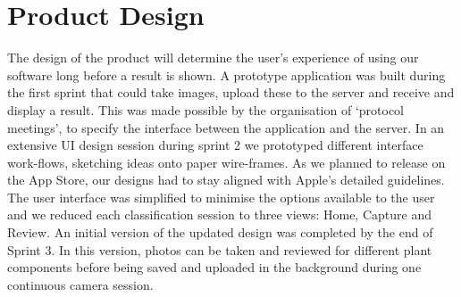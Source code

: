 \documentclass[a4paper,11pt]{article}
\begin{document}
\clearpage

\section{Product Design}

The design of the product will determine the user's experience of using our software long before a result is shown. A prototype application was built during the first sprint that could take images, upload these to the server and receive and display a result. This was made possible by the organisation of `protocol meetings', to specify the interface between the application and the server.  In an extensive UI design session during sprint 2 we prototyped different interface work-flows, sketching ideas onto paper wire-frames. As we planned to release on the App Store, our designs had to stay aligned with Apple's detailed guidelines. The user interface was simplified to minimise the options available to the user and we reduced each classification session to three views: Home, Capture and Review. An initial version of the updated design was completed by the end of Sprint 3. In this version, photos can be taken and reviewed for different plant components before being saved and uploaded in the background during one continuous camera session. 
\end{document}

